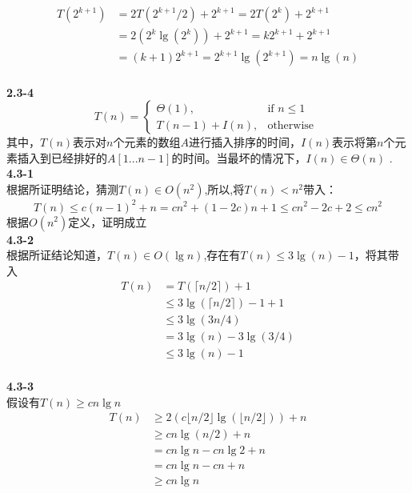 \documentclass[UTF8]{ctexart}
\begin{document}
\begin{equation}
\nonumber
\begin{split}
T(2^{k+1})&=2T(2^{k+1}/2)+2^{k+1}=2T(2^k)+2^{k+1}\\
&=2(2^k\lg(2^k))+2^{k+1}=k2^{k+1}+2^{k+1}\\&=(k+1)2^{k+1}=2^{k+1}\lg(2^{k+1})=n\lg(n)
\end{split}
\end{equation}
\\
\textbf{2.3-4}\\
\begin{equation}
\nonumber
T(n)= 
    \begin{cases}
        \Theta(1), & \text{if } n\le 1 \\
        T(n-1)+I(n), & \text{otherwise }
    \end{cases}
\end{equation}
其中，$T(n)$表示对$n$个元素的数组$A$进行插入排序的时间，$I(n)$表示将第$n$个元素插入到已经排好的$A[1...n-1]$的时间。当最坏的情况下，$I(n) \in \Theta(n)$ .
\\
\textbf{4.3-1}\\
根据所证明结论，猜测$T(n)\in O(n^2)$,所以,将$T(n)<n^2$带入：
$$
T(n)\le c(n-1)^2+n=cn^2+(1-2c)n+1 \le cn^2-2c+2 \le cn^2
$$
根据$O(n^2)$定义，证明成立
\\
\textbf{4.3-2}\\
根据所证结论知道，$T(n)\in O(\lg n)$,存在有$T(n)\le 3\lg (n)-1$，将其带入
\begin{equation}
\nonumber
\begin{split}
T(n)&=T(\lceil n/2 \rceil)+1\\
&\le 3\lg (\lceil n/2 \rceil)-1+1\\
&\le 3\lg(3n/4)\\
&= 3\lg(n)-3\lg(3/4) \\
&\le 3\lg(n)-1
\end{split}
\end{equation}
\\
\noindent\textbf{4.3-3}\\
假设有$T(n) \ge cn\lg n$\\
\begin{equation}
\nonumber
\begin{split}
T(n)&\ge 2(c\lfloor n/2 \rfloor \lg(\lfloor n/2 \rfloor))+n \\
&\ge cn\lg (n/2) +n\\
&=cn\lg n -cn\lg 2 +n\\
&=cn\lg n - cn+n\\
&\ge cn \lg n
\end{split}
\end{equation}
\end{document}
